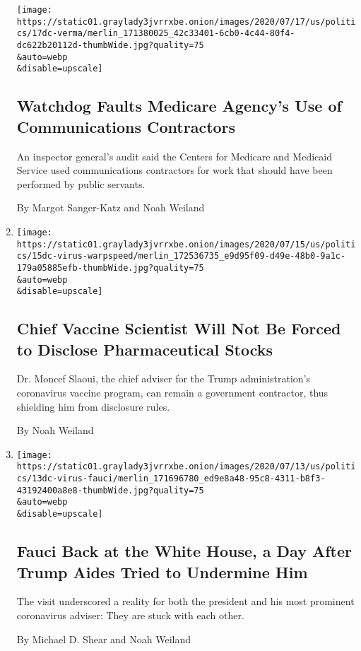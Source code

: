\begin{enumerate}
  \texttt{[image: https://static01.graylady3jvrrxbe.onion/images/2020/07/17/us/politics/17dc-verma/merlin\_171380025\_42c33401-6cb0-4c44-80f4-dc622b20112d-thumbWide.jpg?quality=75\\\&auto=webp\\\&disable=upscale]}

  \hypertarget{watchdog-faults-medicare-agencys-use-of-communications-contractors}{%
  \subsection{Watchdog Faults Medicare Agency's Use of Communications
  Contractors}\label{watchdog-faults-medicare-agencys-use-of-communications-contractors}}

  An inspector general's audit said the Centers for Medicare and
  Medicaid Service used communications contractors for work that should
  have been performed by public servants.

  By Margot Sanger-Katz and Noah Weiland
\item
  \href{/2020/07/15/us/politics/vaccine-Slaoui-coronavirus-trump.html}{}

  \texttt{[image: https://static01.graylady3jvrrxbe.onion/images/2020/07/15/us/politics/15dc-virus-warpspeed/merlin\_172536735\_e9d95f09-d49e-48b0-9a1c-179a05885efb-thumbWide.jpg?quality=75\\\&auto=webp\\\&disable=upscale]}

  \hypertarget{chief-vaccine-scientist-will-not-be-forced-to-disclose-pharmaceutical-stocks}{%
  \subsection{Chief Vaccine Scientist Will Not Be Forced to Disclose
  Pharmaceutical
  Stocks}\label{chief-vaccine-scientist-will-not-be-forced-to-disclose-pharmaceutical-stocks}}

  Dr. Moncef Slaoui, the chief adviser for the Trump administration's
  coronavirus vaccine program, can remain a government contractor, thus
  shielding him from disclosure rules.

  By Noah Weiland
\item
  \href{/2020/07/13/us/politics/fauci-trump-coronavirus.html}{}

  \texttt{[image: https://static01.graylady3jvrrxbe.onion/images/2020/07/13/us/politics/13dc-virus-fauci/merlin\_171696780\_ed9e8a48-95c8-4311-b8f3-43192400a8e8-thumbWide.jpg?quality=75\\\&auto=webp\\\&disable=upscale]}

  \hypertarget{fauci-back-at-the-white-house-a-day-after-trump-aides-tried-to-undermine-him}{%
  \subsection{Fauci Back at the White House, a Day After Trump Aides
  Tried to Undermine
  Him}\label{fauci-back-at-the-white-house-a-day-after-trump-aides-tried-to-undermine-him}}

  The visit underscored a reality for both the president and his most
  prominent coronavirus adviser: They are stuck with each other.

  By Michael D. Shear and Noah Weiland
\end{enumerate}

